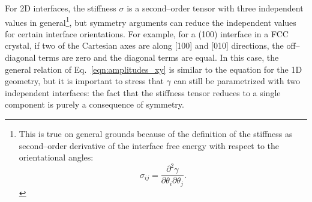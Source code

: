 For 2D interfaces, the stiffness $\sigma$ is a second--order tensor with three independent values in general\footnote{This is true on general grounds because of the definition of the stiffness as second--order derivative of the interface free energy with respect to the orientational angles:
\[ \sigma_{ij}= \frac{\partial^2 \gamma}{\partial\theta_i\partial\theta_j}. \]}, but symmetry arguments can reduce the independent values for certain interface orientations. For example, for a (100) interface in a FCC crystal, if two of the Cartesian axes are along [100] and [010] directions, the off--diagonal terms are zero and the diagonal terms are equal. In this case, the general relation of Eq.~\ref{eqn:amplitudes_xy} is similar to the equation for the 1D geometry, but it is important to stress that $\gamma$ can still be parametrized with two independent interfaces: the fact that the stiffness tensor reduces to a single component is purely a consequence of symmetry.
